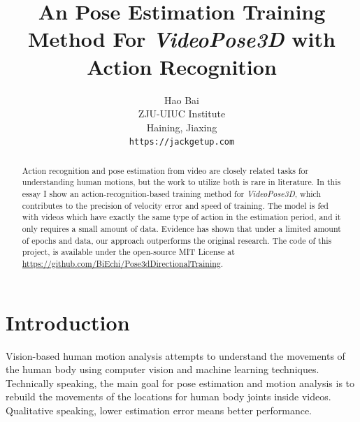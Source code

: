\documentclass[10pt,twocolumn,letterpaper]{article}
\begin{document}
\title{An Pose Estimation Training Method For \textit{VideoPose3D} with Action Recognition}

\author{Hao Bai\\
ZJU-UIUC Institute\\
Haining, Jiaxing\\
{\tt\small https://jackgetup.com}
}

\maketitle

\begin{abstract}
	Action recognition and pose estimation from video are closely related tasks for understanding
	human motions, but the work to utilize both is rare in literature. In this essay I show an 
	action-recognition-based training method for \textit{VideoPose3D}, which contributes to the 
	precision of velocity error and speed of training. The model is fed with videos which have exactly 
	the same type of action in the estimation period, and it only requires a small amount of data. 
	Evidence has shown that under a limited amount of epochs and data, our approach outperforms 
	the original research. The code of this project, is available under the open-source MIT License at
	\url{https://github.com/BiEchi/Pose3dDirectionalTraining}. 
   

\end{abstract}

\section{Introduction}

Vision-based human motion analysis attempts to understand the movements of the human body 
using computer vision and machine learning techniques. Technically speaking, the main goal
for pose estimation and motion analysis is to rebuild the movements of the locations for 
human body joints inside videos. Qualitative speaking, lower estimation error means better 
performance.
\end{document}
